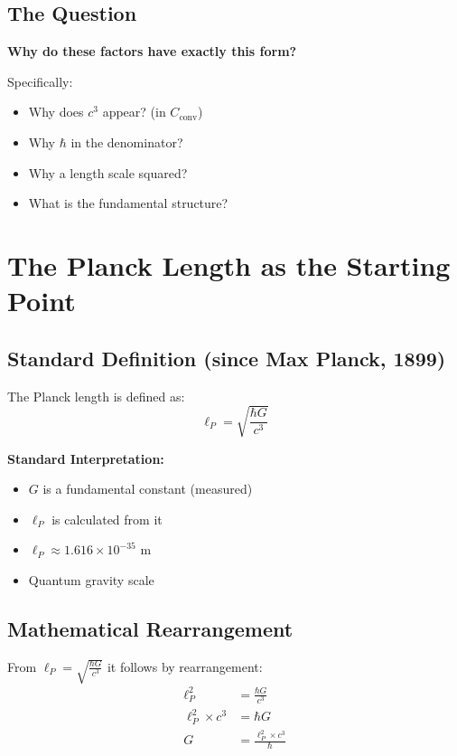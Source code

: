 	\subsection{The Question}
	
	\textbf{Why do these factors have exactly this form?}
	
	Specifically:
	\begin{itemize}
		\item Why does $c^3$ appear? (in $C_{\text{conv}}$)
		\item Why $\hbar$ in the denominator?
		\item Why a length scale squared?
		\item What is the fundamental structure?
	\end{itemize}
	
	\section{The Planck Length as the Starting Point}
	
	\subsection{Standard Definition (since Max Planck, 1899)}
	
	The Planck length is defined as:
	\begin{equation}
		\ell_P = \sqrt{\frac{\hbar G}{c^3}}
	\end{equation}
	
	\textbf{Standard Interpretation:}
	\begin{itemize}
		\item $G$ is a fundamental constant (measured)
		\item $\ell_P$ is calculated from it
		\item $\ell_P \approx 1.616 \times 10^{-35}$ m
		\item Quantum gravity scale
	\end{itemize}
	
	\subsection{Mathematical Rearrangement}
	
	From $\ell_P = \sqrt{\frac{\hbar G}{c^3}}$ it follows by rearrangement:
	\begin{align}
		\ell_P^2 &= \frac{\hbar G}{c^3} \\
		\ell_P^2 \times c^3 &= \hbar G \\
		G &= \frac{\ell_P^2 \times c^3}{\hbar}
	\end{align}
	
